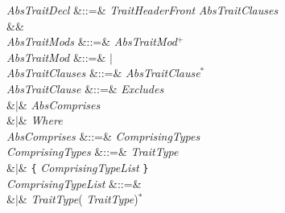 \begin{GrammarTwo}
\emph{AbsTraitDecl}  &::=& 
\emph{TraitHeaderFront} \emph{AbsTraitClauses}
  \\
&&\\

\emph{AbsTraitMods} &::=& \emph{AbsTraitMod}$^+$\\

\emph{AbsTraitMod} &::=&  $|$ \\

\emph{AbsTraitClauses} &::=& \emph{AbsTraitClause}$^*$\\

\emph{AbsTraitClause} &::=& \emph{Excludes} \\
&$|$& \emph{AbsComprises} \\
&$|$& \emph{Where} \\

\emph{AbsComprises} &::=&  \emph{ComprisingTypes} \\

\emph{ComprisingTypes}
&::=& \emph{TraitType} \\
&$|$& \texttt{\{} \emph{ComprisingTypeList} \texttt{\}} \\

\emph{ComprisingTypeList}
&::=& \EXP{\ldots} \\
&$|$& \emph{TraitType}(\EXP{,} \emph{TraitType})$^*$ \options{\EXP{,} \ldots}\\

\end{GrammarTwo}

